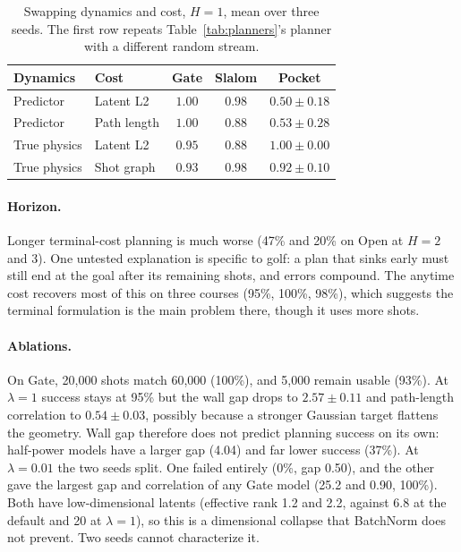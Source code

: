 \documentclass[10pt,twocolumn]{article}
\begin{document}
\begin{table}[t]
\centering\footnotesize
\begin{tabular}{@{}llccc@{}}
\toprule
Dynamics & Cost & Gate & Slalom & Pocket\\
\midrule
Predictor & Latent L2 & $1.00$ & $0.98$ & $0.50\pm0.18$\\
Predictor & Path length & $1.00$ & $0.88$ & $0.53\pm0.28$\\
True physics & Latent L2 & $0.95$ & $0.88$ & $1.00\pm0.00$\\
True physics & Shot graph & $0.93$ & $0.98$ & $0.92\pm0.10$\\
\bottomrule
\end{tabular}
\caption{Swapping dynamics and cost, $H{=}1$, mean over three seeds. The first row repeats Table~\ref{tab:planners}'s planner with a different random stream.}
\label{tab:factorial}
\end{table}

\paragraph{Horizon.} Longer terminal-cost planning is much worse (47\% and 20\% on Open at $H{=}2$ and 3). One untested explanation is specific to golf: a plan that sinks early must still end at the goal after its remaining shots, and errors compound. The anytime cost recovers most of this on three courses (95\%, 100\%, 98\%), which suggests the terminal formulation is the main problem there, though it uses more shots.

\paragraph{Ablations.} On Gate, 20,000 shots match 60,000 (100\%), and 5,000 remain usable (93\%). At $\lambda{=}1$ success stays at 95\% but the wall gap drops to $2.57\pm0.11$ and path-length correlation to $0.54\pm0.03$, possibly because a stronger Gaussian target flattens the geometry. Wall gap therefore does not predict planning success on its own: half-power models have a larger gap (4.04) and far lower success (37\%). At $\lambda{=}0.01$ the two seeds split. One failed entirely (0\%, gap 0.50), and the other gave the largest gap and correlation of any Gate model (25.2 and 0.90, 100\%). Both have low-dimensional latents (effective rank 1.2 and 2.2, against 6.8 at the default and 20 at $\lambda{=}1$), so this is a dimensional collapse that BatchNorm does not prevent. Two seeds cannot characterize it.
\end{document}
